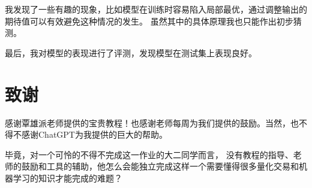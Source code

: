 \documentclass[final,5p,times,twocolumn,authoryear]{elsarticle}
\begin{document}
我发现了一些有趣的现象，比如模型在训练时容易陷入局部最优，通过调整输出的期待值可以有效避免这种情况的发生。
虽然其中的具体原理我也只能作出初步猜测。

最后，我对模型的表现进行了评测，发现模型在测试集上表现良好。

\section*{致谢}
感谢覃雄派老师提供的宝贵教程！也感谢老师每周为我们提供的鼓励。当然，也不得不感谢ChatGPT为我提供的巨大的帮助。

毕竟，对一个可怜的不得不完成这一作业的大二同学而言，
没有教程的指导、老师的鼓励和工具的辅助，他怎么会能独立完成这样一个需要懂得很多量化交易和机器学习的知识才能完成的难题？

\appendix









\end{document}
